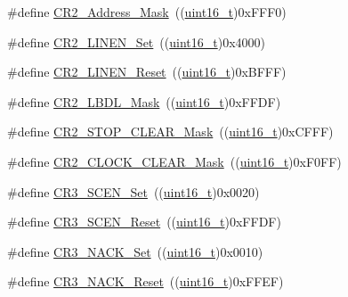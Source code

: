 \begin{DoxyCompactItemize}
\#define \hyperlink{group___u_s_a_r_t___private___defines_ga080c343a5a95d4419789b94405c27764}{C\+R2\+\_\+\+Address\+\_\+\+Mask}~((\hyperlink{_p_e___types_8h_a1f1825b69244eb3ad2c7165ddc99c956}{uint16\+\_\+t})0x\+F\+F\+F0)
\item 
\#define \hyperlink{group___u_s_a_r_t___private___defines_gabc3f2b022d70a11fd0605e58cb23023f}{C\+R2\+\_\+\+L\+I\+N\+E\+N\+\_\+\+Set}~((\hyperlink{_p_e___types_8h_a1f1825b69244eb3ad2c7165ddc99c956}{uint16\+\_\+t})0x4000)
\item 
\#define \hyperlink{group___u_s_a_r_t___private___defines_ga7b8fbe7be4c85c16ea1c1e3c9fa95b05}{C\+R2\+\_\+\+L\+I\+N\+E\+N\+\_\+\+Reset}~((\hyperlink{_p_e___types_8h_a1f1825b69244eb3ad2c7165ddc99c956}{uint16\+\_\+t})0x\+B\+F\+F\+F)
\item 
\#define \hyperlink{group___u_s_a_r_t___private___defines_ga9b365a89de44809a52895090e9050646}{C\+R2\+\_\+\+L\+B\+D\+L\+\_\+\+Mask}~((\hyperlink{_p_e___types_8h_a1f1825b69244eb3ad2c7165ddc99c956}{uint16\+\_\+t})0x\+F\+F\+D\+F)
\item 
\#define \hyperlink{group___u_s_a_r_t___private___defines_ga8a2294276016f30cb361a7f54ad07cd4}{C\+R2\+\_\+\+S\+T\+O\+P\+\_\+\+C\+L\+E\+A\+R\+\_\+\+Mask}~((\hyperlink{_p_e___types_8h_a1f1825b69244eb3ad2c7165ddc99c956}{uint16\+\_\+t})0x\+C\+F\+F\+F)
\item 
\#define \hyperlink{group___u_s_a_r_t___private___defines_ga846e1873279b2b0798cc34d76bd80592}{C\+R2\+\_\+\+C\+L\+O\+C\+K\+\_\+\+C\+L\+E\+A\+R\+\_\+\+Mask}~((\hyperlink{_p_e___types_8h_a1f1825b69244eb3ad2c7165ddc99c956}{uint16\+\_\+t})0x\+F0\+F\+F)
\item 
\#define \hyperlink{group___u_s_a_r_t___private___defines_gab47df7b36b4f1315953f6aa45de2fb61}{C\+R3\+\_\+\+S\+C\+E\+N\+\_\+\+Set}~((\hyperlink{_p_e___types_8h_a1f1825b69244eb3ad2c7165ddc99c956}{uint16\+\_\+t})0x0020)
\item 
\#define \hyperlink{group___u_s_a_r_t___private___defines_ga294c473dc7f8ff3e9cbaa0675c8c75f3}{C\+R3\+\_\+\+S\+C\+E\+N\+\_\+\+Reset}~((\hyperlink{_p_e___types_8h_a1f1825b69244eb3ad2c7165ddc99c956}{uint16\+\_\+t})0x\+F\+F\+D\+F)
\item 
\#define \hyperlink{group___u_s_a_r_t___private___defines_ga950cc9f7251709854754add7d9aaca60}{C\+R3\+\_\+\+N\+A\+C\+K\+\_\+\+Set}~((\hyperlink{_p_e___types_8h_a1f1825b69244eb3ad2c7165ddc99c956}{uint16\+\_\+t})0x0010)
\item 
\#define \hyperlink{group___u_s_a_r_t___private___defines_gabed0cac273ff4faf009e8c35243c1e10}{C\+R3\+\_\+\+N\+A\+C\+K\+\_\+\+Reset}~((\hyperlink{_p_e___types_8h_a1f1825b69244eb3ad2c7165ddc99c956}{uint16\+\_\+t})0x\+F\+F\+E\+F)

\end{DoxyCompactItemize}
